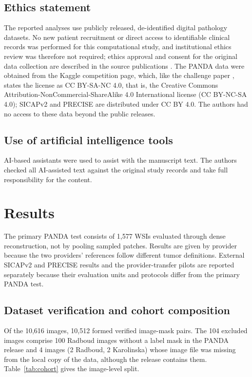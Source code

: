 \documentclass[10pt,letterpaper]{article}
\begin{document}
\subsection*{Ethics statement}
The reported analyses use publicly released, de-identified digital pathology datasets. No new patient recruitment or direct access to identifiable clinical records was performed for this computational study, and institutional ethics review was therefore not required; ethics approval and consent for the original data collection are described in the source publications \cite{bib11,bib44,bib46}. The PANDA data were obtained from the Kaggle competition page, which, like the challenge paper \cite{bib11}, states the license as CC BY-SA-NC 4.0, that is, the Creative Commons Attribution-NonCommercial-ShareAlike 4.0 International license (CC BY-NC-SA 4.0); SICAPv2 and PRECISE are distributed under CC BY 4.0. The authors had no access to these data beyond the public releases.

\subsection*{Use of artificial intelligence tools}
AI-based assistants were used to assist with the manuscript text. The authors checked all AI-assisted text against the original study records and take full responsibility for the content.

\section*{Results}
The primary PANDA test consists of 1,577 WSIs evaluated through dense reconstruction, not by pooling sampled patches. Results are given by provider because the two providers' references follow different tumor definitions. External SICAPv2 and PRECISE results and the provider-transfer pilots are reported separately because their evaluation units and protocols differ from the primary PANDA test.

\subsection*{Dataset verification and cohort composition}
Of the 10,616 images, 10,512 formed verified image-mask pairs. The 104 excluded images comprise 100 Radboud images without a label mask in the PANDA release and 4 images (2 Radboud, 2 Karolinska) whose image file was missing from the local copy of the data, although the release contains them. Table~\ref{tab:cohort} gives the image-level split.
\end{document}
